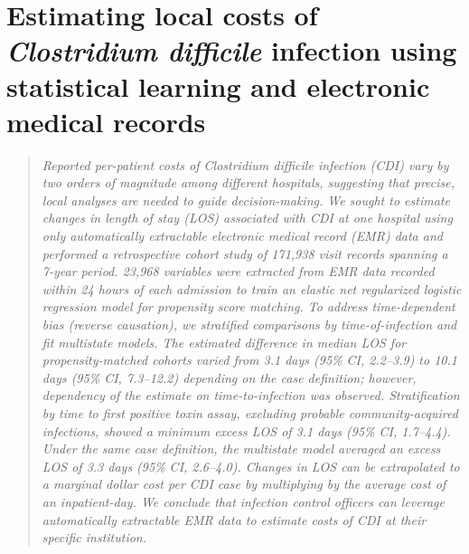 
\chapter{Estimating local costs of \emph{Clostridium difficile} infection using statistical learning and electronic medical records}
\label{chap:cdi_cost}



\begin{quote}
\emph{Reported per-patient costs of \emph{Clostridium difficile} infection (CDI) vary by two orders of magnitude among different hospitals, suggesting that precise, local analyses are needed to guide decision-making. We sought to estimate changes in length of stay (LOS) associated with CDI at one hospital using only automatically extractable electronic medical record (EMR) data and performed a retrospective cohort study of 171,938 visit records spanning a 7-year period. 23,968 variables were extracted from EMR data recorded within 24 hours of each admission to train an elastic net regularized logistic regression model for propensity score matching. To address time-dependent bias (reverse causation), we stratified comparisons by time-of-infection and fit multistate models. The estimated difference in median LOS for propensity-matched cohorts varied from 3.1 days (95\% CI, 2.2–3.9) to 10.1 days (95\% CI, 7.3–12.2) depending on the case definition; however, dependency of the estimate on time-to-infection was observed. Stratification by time to first positive toxin assay, excluding probable community-acquired infections, showed a minimum excess LOS of 3.1 days (95\% CI, 1.7–4.4). Under the same case definition, the multistate model averaged an excess LOS of 3.3 days (95\% CI, 2.6–4.0). Changes in LOS can be extrapolated to a marginal dollar cost per CDI case by multiplying by the average cost of an inpatient-day. We conclude that infection control officers can leverage automatically extractable EMR data to estimate costs of CDI at their specific institution.
}
\end{quote}

